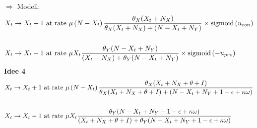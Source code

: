 \documentclass[10pt,a4paper]{article}
\begin{document}
$\Rightarrow$ Modell:
\begin{align*}
\begin{split}
X_t \rightarrow X_t + 1 & \textnormal{ at rate } \mu\left(N-X_t\right)\frac{\theta_X (X_t + N_X)}{\theta_X (X_t + N_X) + (N - X_t + N_Y)} \times \mathrm{sigmoid}\left(u_{con}\right) \\
&\\
X_t \rightarrow X_t - 1 & \textnormal{ at rate } \mu X_t\frac{\theta_Y(N-X_t+N_Y)}{(X_t + N_X) + \theta_Y(N-X_t+N_Y)} \times \mathrm{sigmoid}\left(- u_{pro}\right)
\end{split}
\end{align*}
\newpage
\textbf{Idee 4}\newline
\begin{align*}
\begin{split}
X_t \rightarrow X_t + 1 & \textnormal{ at rate } \mu\left(N-X_t\right)\frac{\theta_X (X_t + N_X + \theta + I)}{\theta_X (X_t + N_X + \theta + I) + (N - X_t + N_Y + 1-\epsilon + \kappa\omega)} \\
&\\
X_t \rightarrow X_t - 1 & \textnormal{ at rate } \mu X_t\frac{\theta_Y(N-X_t+N_Y+1-\epsilon+\kappa\omega)}{(X_t + N_X+\theta+I) + \theta_Y(N-X_t+N_Y+1-\epsilon+\kappa\omega)}
\end{split}
\end{align*}
\end{document}
